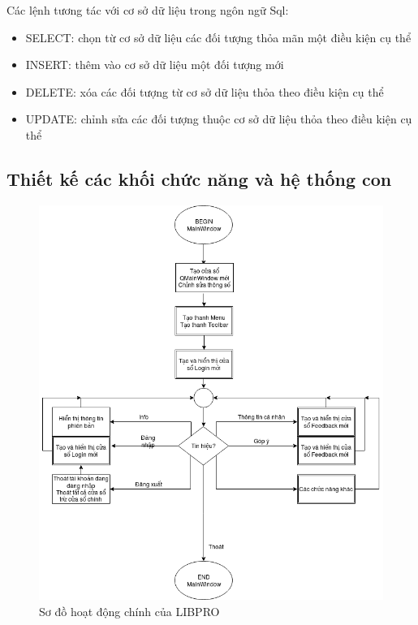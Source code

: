 \documentclass[a4paper]{article}
\begin{document}
Các lệnh tương tác với cơ sở dữ liệu trong ngôn ngữ Sql:\\
\begin{itemize}
\item SELECT: chọn từ cơ sở dữ liệu các đối tượng thỏa mãn một điều kiện cụ thể
\item INSERT: thêm vào cơ sở dữ liệu một đối tượng mới 
\item DELETE: xóa các đối tượng từ cơ sở dữ liệu thỏa theo điều kiện cụ thể 
\item UPDATE: chỉnh sửa các đối tượng thuộc cơ sở dữ liệu thỏa theo điều kiện cụ thể
\end{itemize}
\subsection{Thiết kế các khối chức năng và hệ thống con}
\begin{figure}[h!]
	\begin{center}
		\includegraphics[scale=.5]{mainDiagram.png}
		\caption{Sơ đồ hoạt động chính của LIBPRO}
	\end{center}
	\end{figure}
	\newpage \newpage 
\end{document}

